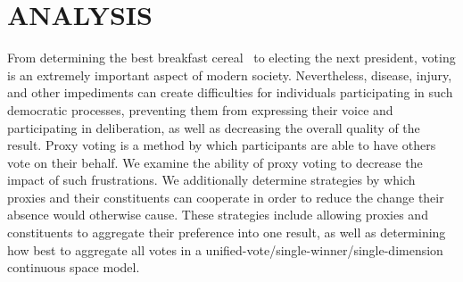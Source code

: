 %
%

\renewcommand{\chptindicator}{ch2}

\setcounter{chapter}{1}
\chapter{ANALYSIS}\label{ch:analysis}
\thispagestyle{empty}
From determining the best breakfast cereal~\cite{Curtis2021} to electing the next
president, voting is an extremely important aspect of modern society.
Nevertheless, disease, injury, and other impediments can create difficulties for
individuals participating in such democratic processes, preventing them from
expressing their voice and participating in deliberation, as well as decreasing
the overall quality of the result.
Proxy voting is a method by which participants are able to have others vote on their
behalf.
We examine the ability of proxy voting to decrease the impact of such frustrations.
We additionally determine strategies by which proxies and their constituents can
cooperate in order to reduce the change their absence would otherwise cause.
These strategies include allowing proxies and constituents to aggregate their
preference into one result, as well as determining how best to aggregate all votes
in a unified-vote/single-winner/single-dimension continuous space model.









